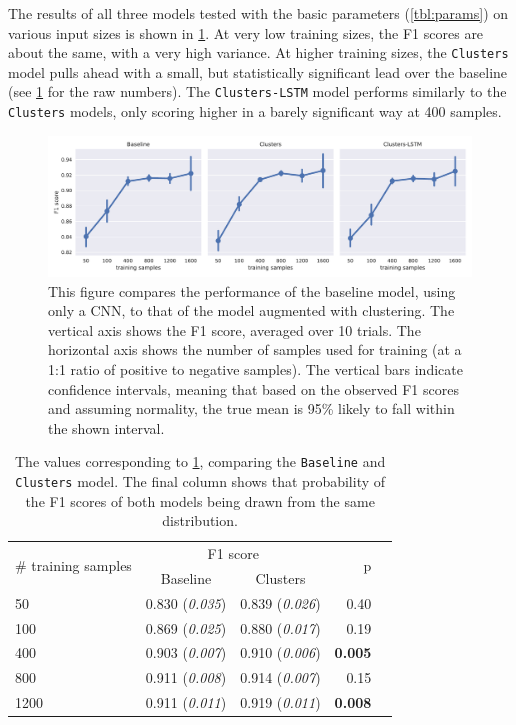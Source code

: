 
\FloatBarrier%
The results of all three models tested with the basic parameters
(\cref{tbl:params}) on various input sizes is shown in \cref{fig:result}. At
very low training sizes, the F1 scores are about the same, with a very high
variance. At higher training sizes, the \texttt{Clusters} model pulls ahead with
a small, but statistically significant lead over the baseline
(see \cref{tbl:base_cl} for the raw numbers). The \texttt{Clusters-LSTM} model
performs similarly to the \texttt{Clusters} models, only scoring higher in a
barely significant way at 400 samples. 

\begin{figure}[tb]
  \centering
  \includegraphics[width=\textwidth]{figures/results/main/factorplot_f1.pdf}
  \caption{This figure compares the performance of the baseline model, using
    only a CNN, to that of the model augmented with clustering. The vertical axis
    shows the F1 score, averaged over 10 trials. The horizontal axis shows the
    number of samples used for training (at a 1:1 ratio of positive to negative
    samples). The vertical bars indicate confidence intervals, meaning that based on
    the observed F1 scores and assuming normality, the true mean is 95\% likely to
  fall within the shown interval.\label{fig:result}}
\end{figure}
\begin{table}[tb]
  \centering
  \begin{tabular}{lrrrr}
    \toprule
    \multirow{2}[3]{*}{\# training samples} & \multicolumn{2}{c}{F1 score} & \multirow{2}[3]{*}{p} \\
    \cmidrule(lr){2-3}
    & \multicolumn{1}{c}{Baseline} & \multicolumn{1}{c}{Clusters} & \\
    \midrule
    50   & 0.830 (\emph{0.035}) & 0.839 (\emph{0.026}) & 0.40 \\
    100  & 0.869 (\emph{0.025}) & 0.880 (\emph{0.017}) & 0.19 \\
    400  & 0.903 (\emph{0.007}) & 0.910 (\emph{0.006}) & \textbf{0.005} \\
    800  & 0.911 (\emph{0.008}) & 0.914 (\emph{0.007}) & 0.15 \\
    1200 & 0.911 (\emph{0.011}) & 0.919 (\emph{0.011}) & \textbf{0.008} \\
    \bottomrule
  \end{tabular}
  \caption{The values corresponding to \cref{fig:result}, comparing the
    \texttt{Baseline} and \texttt{Clusters} model. The final column shows
    that probability of the F1 scores of both models being drawn from the same
  distribution.\label{tbl:base_cl}}
\end{table}
